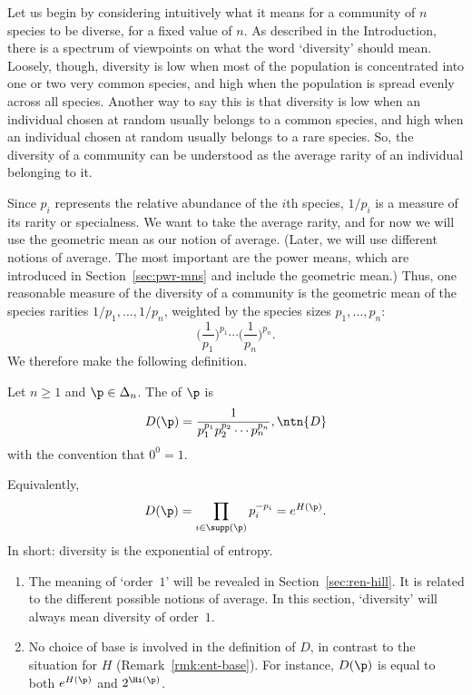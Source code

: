 Let us begin by considering intuitively what it means for a community of
$n$ species to be diverse, for a fixed value of $n$.  As described in the
Introduction, there is a spectrum of viewpoints on what the word
`diversity' should mean.  Loosely, though, diversity is low when most of
the population is concentrated into one or two very common species, and
high when the population is spread evenly across all species.  Another way
to say this is that diversity is low when an individual chosen at random
usually belongs to a common species, and high when an individual chosen at
random usually belongs to a rare species.  So, the diversity of
a community can be understood as the average rarity of an individual
belonging to it.

Since $p_i$ represents the relative abundance of the $i$th species, $1/p_i$
is a measure of its rarity or specialness.
We want to take the average rarity, and for now we will use the geometric
mean as our notion of average.  (Later, we will use different notions of
average.  The most important are the power means, which are introduced in
Section~\ref{sec:pwr-mns} and include the geometric mean.)  Thus, one
reasonable measure of the diversity of a community is the geometric mean of
the species rarities $1/p_1, \ldots, 1/p_n$, weighted by the species sizes
$p_1, \ldots, p_n$:
\[
\Biggl( \frac{1}{p_1} \Biggr)^{p_1}
\cdots
\Biggl( \frac{1}{p_n} \Biggr)^{p_n}.
\]
We therefore make the following definition.

\begin{defn}
% 
Let $n \geq 1$ and $\p \in \Delta_n$.  The 
of $\p$ is 
\[
D(\p)
=
\frac{1}{p_1^{p_1} p_2^{p_2} \cdots p_n^{p_n}},
\ntn{D}
\]
with the convention that $0^0 = 1$.
\end{defn}

Equivalently,
\[
D(\p)
=
\prod_{i \in \supp(\p)} p_i^{-p_i}
=
e^{H(\p)}.
\]
In short: diversity is the exponential of entropy.

\begin{remarks}
\begin{enumerate}
\item
The meaning of `order~$1$' will be revealed in Section~\ref{sec:ren-hill}.
It is related to the different possible notions of average.  In this
section, `diversity' will always mean diversity of order~$1$.

\item
No choice of base is involved in the definition of $D$, in contrast to the
situation for $H$ (Remark~\ref{rmk:ent-base}).  For instance, $D(\p)$ is
equal to both $e^{H(\p)}$ and $2^{\Hi(\p)}$.
\end{enumerate}
\end{remarks}


